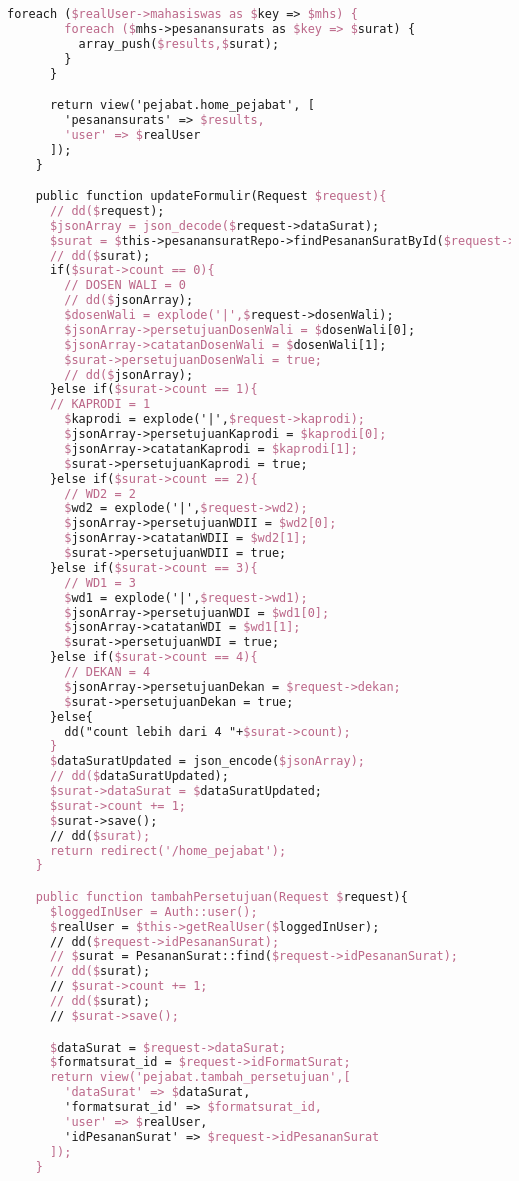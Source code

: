 \begin{lstlisting}[language=tex,basicstyle=\tiny,caption=PesanansuratController.php]
      foreach ($realUser->mahasiswas as $key => $mhs) {
        foreach ($mhs->pesanansurats as $key => $surat) {
          array_push($results,$surat);
        }
      }

      return view('pejabat.home_pejabat', [
        'pesanansurats' => $results,
        'user' => $realUser
      ]);
    }

    public function updateFormulir(Request $request){
      // dd($request);
      $jsonArray = json_decode($request->dataSurat);
      $surat = $this->pesanansuratRepo->findPesananSuratById($request->idPesanansurat);
      // dd($surat);
      if($surat->count == 0){
        // DOSEN WALI = 0
        // dd($jsonArray);
        $dosenWali = explode('|',$request->dosenWali);
        $jsonArray->persetujuanDosenWali = $dosenWali[0];
        $jsonArray->catatanDosenWali = $dosenWali[1];
        $surat->persetujuanDosenWali = true;
        // dd($jsonArray);
      }else if($surat->count == 1){
      // KAPRODI = 1
        $kaprodi = explode('|',$request->kaprodi);
        $jsonArray->persetujuanKaprodi = $kaprodi[0];
        $jsonArray->catatanKaprodi = $kaprodi[1];
        $surat->persetujuanKaprodi = true;
      }else if($surat->count == 2){
        // WD2 = 2
        $wd2 = explode('|',$request->wd2);
        $jsonArray->persetujuanWDII = $wd2[0];
        $jsonArray->catatanWDII = $wd2[1];
        $surat->persetujuanWDII = true;
      }else if($surat->count == 3){
        // WD1 = 3
        $wd1 = explode('|',$request->wd1);
        $jsonArray->persetujuanWDI = $wd1[0];
        $jsonArray->catatanWDI = $wd1[1];
        $surat->persetujuanWDI = true;
      }else if($surat->count == 4){
        // DEKAN = 4
        $jsonArray->persetujuanDekan = $request->dekan;
        $surat->persetujuanDekan = true;
      }else{
        dd("count lebih dari 4 "+$surat->count);
      }
      $dataSuratUpdated = json_encode($jsonArray);
      // dd($dataSuratUpdated);
      $surat->dataSurat = $dataSuratUpdated;
      $surat->count += 1;
      $surat->save();
      // dd($surat);
      return redirect('/home_pejabat');
    }

    public function tambahPersetujuan(Request $request){
      $loggedInUser = Auth::user();
      $realUser = $this->getRealUser($loggedInUser);
      // dd($request->idPesananSurat);
      // $surat = PesananSurat::find($request->idPesananSurat);
      // dd($surat);
      // $surat->count += 1;
      // dd($surat);
      // $surat->save();

      $dataSurat = $request->dataSurat;
      $formatsurat_id = $request->idFormatSurat;
      return view('pejabat.tambah_persetujuan',[
        'dataSurat' => $dataSurat,
        'formatsurat_id' => $formatsurat_id,
        'user' => $realUser,
        'idPesananSurat' => $request->idPesananSurat
      ]);
    }


\end{lstlisting}
